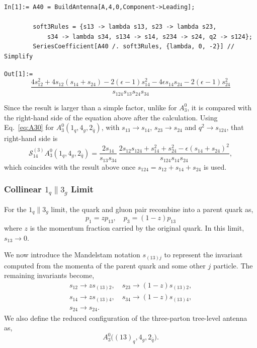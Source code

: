 \begin{mdframed}[backgroundcolor=gray!10, linewidth=0pt]
\begin{lstlisting}
In[1]:= A40 = BuildAntenna[A,4,0,Component->Leading];

        soft3Rules = {s13 -> lambda s13, s23 -> lambda s23,
            s34 -> lambda s34, s134 -> s14, s234 -> s24, q2 -> s124};
        SeriesCoefficient[A40 /. soft3Rules, {lambda, 0, -2}] // Simplify
\end{lstlisting}
\texttt{Out[1]:=}
    \begin{equation*}
        \frac{4s_{12}^2+4s_{12}(s_{14}+s_{24})-2(\epsilon-1)s_{14}^2-4\epsilon s_{14}s_{24}-2(\epsilon-1)s_{24}^2}{s_{124}s_{13}s_{24}s_{34}}
    \end{equation*}
\end{mdframed}
Since the result is larger than a simple factor, unlike for $A_3^0$, it is compared with the right-hand side of the
equation above after the calculation. Using Eq.~\eqref{eq:A30} for $A_3^0(1_q,4_g,2_{\bar q})$, with $s_{13}\to s_{14}$,
$s_{23}\to s_{24}$ and $q^2\to s_{124}$, that right-hand side is
\begin{equation}
    \mathcal S_{14}^{(3)}A_3^0(1_q,4_g,2_{\bar q})=\frac{2s_{14}}{s_{13}s_{34}}\,
    \frac{2s_{12}s_{124}+s_{14}^2+s_{24}^2-\epsilon(s_{14}+s_{24})^2}{s_{124}s_{14}s_{24}},
\end{equation}
which coincides with the result above once $s_{124}=s_{12}+s_{14}+s_{24}$ is used.


\subsubsection{Collinear $1_q\parallel 3_g$ Limit}

For the $1_q\parallel 3_g$ limit, the quark and gluon pair recombine into a parent quark as,
\begin{equation}
    p_1=zp_{13},\quad p_3=(1-z)p_{13}
\end{equation}
where $z$ is the momentum fraction carried by the original quark. In this limit, $s_{13}\to 0$.

We now introduce the Mandelstam notation $s_{(13)j}$ to represent the invariant computed from the momenta of the 
parent quark and some other $j$ particle. The remaining invariants become,
\begin{equation}
    \begin{gathered}
        s_{12}\to zs_{(13)2},\quad s_{23}\to(1-z)s_{(13)2},\\
        s_{14}\to zs_{(13)4},\quad s_{34}\to(1-z)s_{(13)4},\\
        s_{24}\to s_{24}.
    \end{gathered}
\end{equation} 
We also define the reduced configuration of the three-parton tree-level antenna as,
\begin{equation}
    A_3^0\Big((13)_q,4_g,2_{\bar q}\Big).
\end{equation}

